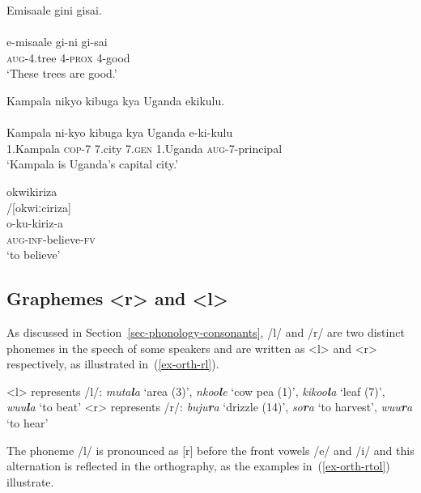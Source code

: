 \ea \label{ex-ortho-gk}
\begin{xlist}	
    \ex \label{ex-ortho-g1}
    \gllll  Emisaale gini gisai.\\
    [emisaːle ɟini ɟisai]\\
        	    e-misaale gi-ni gi-sai\\
	\textsc{aug}-4.tree 4-\textsc{prox} 4-good\\
    \glt  ‘These trees are good.’

   \ex  \label{ex-ortho-k1}
    \gllll Kampala nikyo kibuga kya Uganda ekikulu.\\
[kaːmpala nico ciβuga ca ugaːnda ecikulu]\\
     Kampala  ni-kyo  kibuga  kya  Uganda  e-ki-kulu\\
   1.Kampala \textsc{cop}-7 7.city 7.\textsc{gen} 1.Uganda  \textsc{aug}-7-principal\\
    \glt  ‘Kampala is Uganda's capital city.'

\ex	\label{ex-ortho-k2}
\gllll okwikiriza\\
[okwiːkiriza]/[okwiːciriza]\\
	o-ku-kiriz-a\\
	\textsc{aug}-\textsc{inf}-believe-\textsc{fv}\\
	\glt  ‘to believe'
\end{xlist}	
\z


\subsection{Graphemes <r> and <l>} \label{sec-orthography-lr}

As discussed in Section~\ref{sec-phonology-consonants}, /l/ and /r/ are two distinct phonemes in the speech of some speakers and are written as <l> and <r> respectively, as illustrated in~(\ref{ex-orth-rl}).

\ea \label{ex-orth-rl}
\begin{xlist}
\ex  <l> represents /l/:  \textit{muta\textbf{l}a} `area (3)',  \textit{nkoo\textbf{l}e} `cow pea (1)',  \textit{kikoo\textbf{l}a} `leaf (7)',  \textit{wuu\textbf{l}a} `to beat'
\ex <r> represents /r/:  \textit{buju\textbf{r}a} `drizzle (14)',  \textit{so\textbf{r}a} `to harvest',  \textit{wuu\textbf{r}a} `to hear'
\end{xlist}
\z

The phoneme /l/ is pronounced as [r] before the front vowels /e/ and /i/ and this alternation is reflected in the orthography, as the examples in~(\ref{ex-orth-rtol}) illustrate.

